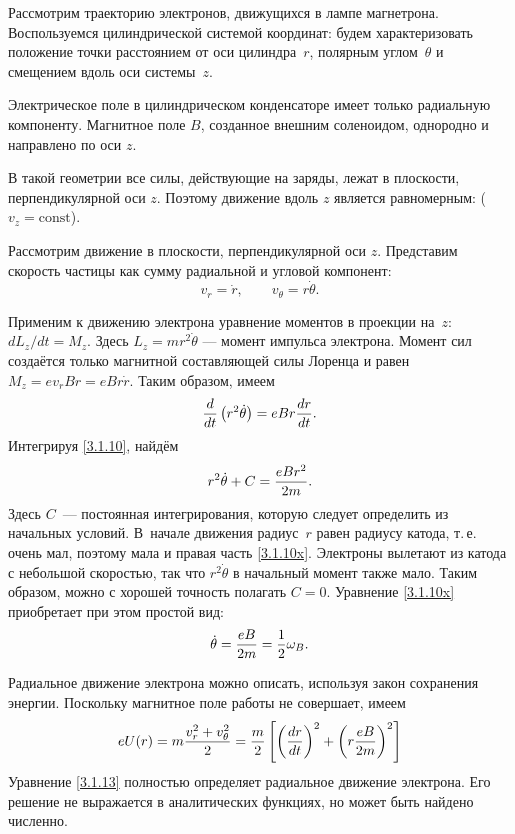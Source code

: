 \begin{small}
Рассмотрим траекторию электронов, движущихся в лампе магнетрона.
Воспользуемся цилиндрической системой координат: будем характеризовать 
положение точки расстоянием от оси цилиндра~$r$, 
полярным углом~$\theta$ и смещением вдоль оси системы~$z$.

Электрическое поле в цилиндрическом конденсаторе 
имеет только радиальную компоненту. Магнитное поле $B$, 
созданное внешним соленоидом, однородно и направлено по оси $z$.
 
В такой геометрии все силы, действующие на заряды, лежат в плоскости,
перпендикулярной оси $z$.  Поэтому движение вдоль $z$ является равномерным:
($v_z=\mathrm{const}$).

Рассмотрим движение в плоскости, перпендикулярной оси $z$. 
Представим скорость частицы как сумму радиальной и угловой компонент:
\[
 v_r=\dot{r},\qquad v_{\theta} = r\dot{\theta}.
\]

Применим к движению электрона уравнение моментов в проекции на~$z$:
$dL_z/dt = M_z$.
Здесь $L_z = mr^2 \dot{\theta}$ --- момент импульса электрона.
Момент сил создаётся только магнитной составляющей силы Лоренца и равен
$M_z = e v_r B r =  e B r \dot{r}$. Таким образом, имеем
\begin{equation}
\eqmark{3.1.10}
\frac{d}{dt}\left(r^2\dot{\theta}\right) = eBr\frac{dr}{dt}.
\end{equation}
Интегрируя \eqref{3.1.10}, найдём
\begin{equation}
	r^2\dot{\theta}+C=\frac{eBr^2}{2m}.
	\eqmark{3.1.10x}
\end{equation}
Здесь $C$~--- постоянная интегрирования, которую следует определить из начальных
условий. В~начале движения радиус~$r$ равен радиусу катода, т.\,е. очень мал,
поэтому мала и правая часть \eqref{3.1.10x}. Электроны вылетают из
катода с небольшой скоростью, так что $r^{2}\dot{\theta}$ в начальный момент
также мало. Таким образом, можно с хорошей точность полагать $C=0$. 
Уравнение \eqref{3.1.10x} приобретает при этом простой вид:
\begin{equation}
	\dot{\theta}=\frac{eB}{2m} = \frac12 \omega_B.
	\eqmark{3.1.12}
\end{equation}

Радиальное движение электрона можно описать, используя закон сохранения
энергии. Поскольку магнитное поле работы не совершает, имеем
\begin{equation}	\eqmark{3.1.13}
eU(r)=m\frac{v_r^2+v_\theta^2}{2} = 
\frac{m}{2} \left[\left(\frac{dr}{dt}\right)^2 + \left(r \frac{eB}{2m}\right)^{2}\right]
\end{equation}
Уравнение \eqref{3.1.13} полностью определяет радиальное 
движение электрона. Его решение не выражается в аналитических функциях,
но может быть найдено численно.


\end{small}

